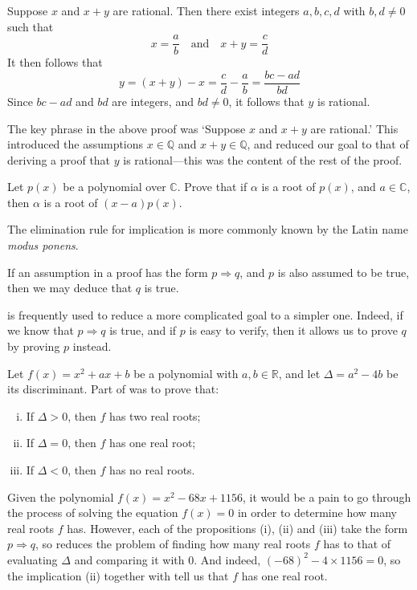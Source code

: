 \begin{cproof}
Suppose $x$ and $x+y$ are rational. Then there exist integers $a,b,c,d$ with $b,d \ne 0$ such that
\[
x = \frac{a}{b} \quad \text{and} \quad x+y = \frac{c}{d}
\]
It then follows that
\[
y = (x+y)-x = \frac{c}{d}-\frac{a}{b} = \frac{bc-ad}{bd}
\]
Since $bc-ad$ and $bd$ are integers, and $bd \ne 0$, it follows that $y$ is rational.
\end{cproof}

The key phrase in the above proof was `Suppose $x$ and $x+y$ are rational.' This introduced the assumptions $x \in \mathbb{Q}$ and $x+y \in \mathbb{Q}$, and reduced our goal to that of deriving a proof that $y$ is rational---this was the content of the rest of the proof.

\begin{exercise}
Let $p(x)$ be a polynomial over $\mathbb{C}$. Prove that if $\alpha$ is a root of $p(x)$, and $a \in \mathbb{C}$, then $\alpha$ is a root of $(x-a)p(x)$.
\end{exercise}

The elimination rule for implication \elimrule{\Rightarrow} is more commonly known by the Latin name \textit{modus ponens}.

\begin{strategy}
\label{strAssumingImplicationsDirect}
If an assumption in a proof has the form $p \Rightarrow q$, and $p$ is also assumed to be true, then we may deduce that $q$ is true.
\end{strategy}

 is frequently used to reduce a more complicated goal to a simpler one. Indeed, if we know that $p \Rightarrow q$ is true, and if $p$ is easy to verify, then it allows us to prove $q$ by proving $p$ instead.

\begin{example}
Let $f(x) = x^2+ax+b$ be a polynomial with $a,b \in \mathbb{R}$, and let $\Delta = a^2-4b$ be its discriminant. Part of  was to prove that:
\begin{enumerate}[(i)]
\item If $\Delta > 0$, then $f$ has two real roots;
\item If $\Delta = 0$, then $f$ has one real root;
\item If $\Delta < 0$, then $f$ has no real roots.
\end{enumerate}
Given the polynomial $f(x) = x^2-68x+1156$, it would be a pain to go through the process of solving the equation $f(x)=0$ in order to determine how many real roots $f$ has. However, each of the propositions (i), (ii) and (iii) take the form $p \Rightarrow q$, so  reduces the problem of finding how many real roots $f$ has to that of evaluating $\Delta$ and comparing it with $0$. And indeed, $(-68)^2 - 4 \times 1156 = 0$, so the implication (ii) together with \elimrule{\Rightarrow} tell us that $f$ has one real root.
\end{example}

